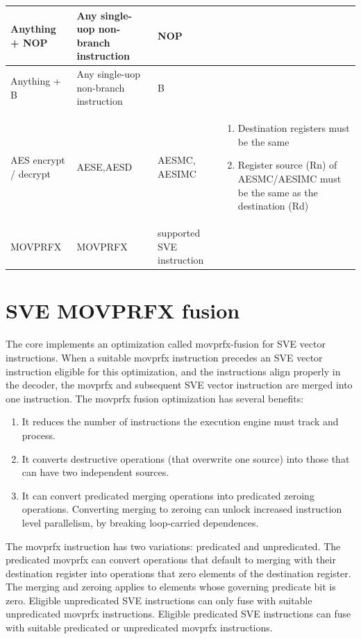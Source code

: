 \documentclass{article}
\begin{document}
\begin{longtable}{|p{2in}|p{1in}|p{1in}|p{2in}|}
Anything + NOP &
Any single-uop non-branch instruction &
NOP &
\\ \hline

Anything + B &
Any single-uop non-branch instruction &
B &
\\ \hline

AES encrypt / decrypt &
AESE,AESD &
AESMC, AESIMC &
\parbox{2in}{
  \begin{enumerate} \item Destination registers must be the same
  \item Register source (Rn) of AESMC/AESIMC must be the same as the destination (Rd)
\end{enumerate}} \\ \hline

MOVPRFX &
MOVPRFX &
supported SVE instruction &
\\ \hline
\end{longtable}

\section{SVE MOVPRFX fusion}

The core implements an optimization called movprfx-fusion for SVE
vector instructions.  When a suitable movprfx instruction precedes an
SVE vector instruction eligible for this optimization, and the
instructions align properly in the decoder, the movprfx and subsequent
SVE vector instruction are merged into one instruction. The movprfx fusion
optimization has several benefits:

\begin{enumerate}
  \item It reduces the number of instructions
    the execution engine must track and process.
  \item It converts destructive operations (that overwrite one source) into those that can have two independent sources.
  \item It can convert predicated merging operations into predicated
    zeroing operations.  Converting merging to zeroing can unlock
    increased instruction level parallelism, by breaking loop-carried
    dependences.
\end{enumerate}

The movprfx instruction has two variations: predicated and
unpredicated.  The predicated movprfx can convert operations that
default to merging with their destination register into operations
that zero elements of the destination register. The merging and
zeroing applies to elements whose governing predicate bit is
zero. Eligible unpredicated SVE instructions can only fuse with
suitable unpredicated movprfx instructions. Eligible predicated SVE
instructions can fuse with suitable predicated or unpredicated movprfx
instructions.
\end{document}
